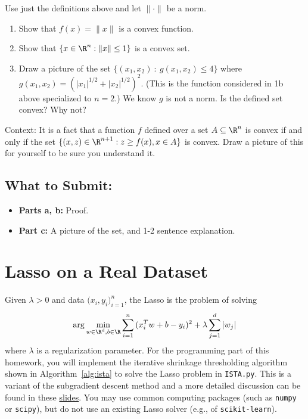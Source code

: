\documentclass{article}
\begin{document}
\begin{bprob}
    Use just the definitions above and let $\| \cdot \|$ be a norm.
    \begin{enumerate}
        \item {} Show that $f(x) = \| x \|$ is a convex function.
        \item {} Show that $\{ x \in \R^n : \|x\| \leq 1\}$ is a convex set.
        \item {} Draw a picture of the set $\{ (x_1,x_2) ~: ~ g(x_1,x_2) \le 4 \}$
        where $g(x_1, x_2)  = \left( |x_1|^{1/2} + |x_2|^{1/2}\right)^2$. (This is the function considered in 1b above specialized to $n=2$.) We know $g$ is not a norm. Is the defined set convex? Why not?
    \end{enumerate}
    Context: It is a fact that a function $f$ defined over a set $A \subseteq \R^n$ is convex if and only if the set $\{ (x, z) \in \R^{n+1} : z \geq f(x), x \in A \}$ is convex. Draw a picture of this for yourself to be sure you understand it.

    \subsection*{What to Submit:}
    \begin{itemize}
        \item \textbf{Parts a, b:} Proof.
        \item \textbf{Part c:} A picture of the set, and 1-2 sentence explanation.
    \end{itemize}
\end{bprob}

\newpage

\section*{Lasso on a Real Dataset}
Given $\lambda >0$ and data $\Big (x_i,y_i \Big)_{i=1}^n$, the Lasso is the problem of solving
\begin{equation*}\label{eq:lasso}
  \arg\min_{{w}\in \R^d, b \in \R} \sum_{i=1}^n { (x_i^T {w} + b - {y}_i)^2 }
    + \lambda \sum_{j=1}^d |{w}_j| 
\end{equation*}
where $\lambda$ is a regularization parameter.
For the programming part of this homework, you will implement the iterative shrinkage thresholding algorithm shown in Algorithm~\ref{alg:ista} to solve the Lasso problem in \texttt{ISTA.py}. This is a variant of the subgradient descent method and a more detailed discussion can be found in these \href{https://www.stat.cmu.edu/~ryantibs/convexopt-F15/lectures/08-prox-grad.pdf}{slides}. You may use common computing packages (such as \texttt{numpy} or \texttt{scipy}), but do not use an existing Lasso solver (e.g., of \texttt{scikit-learn}).
\end{document}
